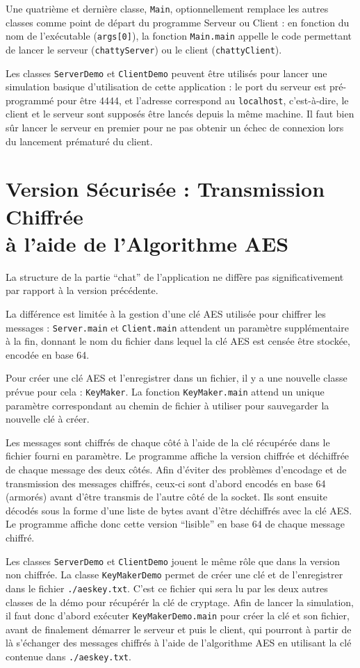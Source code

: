 \documentclass[a4paper,12pt]{article}
\newcommand{\nopagenum}{\thispagestyle{empty}}
\newcommand{\code}[1]{\texttt{#1}}
\begin{document}
    Une quatrième et dernière classe, \code{Main}, optionnellement remplace les autres classes comme point de départ du programme Serveur ou Client : en fonction du nom de l'exécutable (\code{args[0]}), la fonction \code{Main.main} appelle le code permettant de lancer le serveur (\code{chattyServer}) ou le client (\code{chattyClient}).
    
    Les classes \code{ServerDemo} et \code{ClientDemo} peuvent être utilisés pour lancer une simulation basique d'utilisation de cette application : le port du serveur est pré-programmé pour être 4444, et l'adresse correspond au \code{localhost}, c'est-à-dire, le client et le serveur sont supposés être lancés depuis la même machine. Il faut bien sûr lancer le serveur en premier pour ne pas obtenir un échec de connexion lors du lancement prématuré du client.
    
    \section{Version Sécurisée : Transmission Chiffrée \\ à l'aide de l'Algorithme AES}
    
    La structure de la partie ``chat'' de l'application ne diffère pas significativement par rapport à la version précédente.
    
    La différence est limitée à la gestion d'une clé AES utilisée pour chiffrer les messages : \code{Server.main} et \code{Client.main} attendent un paramètre supplémentaire à la fin, donnant le nom du fichier dans lequel la clé AES est censée être stockée, encodée en base 64.
    
    Pour créer une clé AES et l'enregistrer dans un fichier, il y a une nouvelle classe prévue pour cela : \code{KeyMaker}. La fonction \code{KeyMaker.main} attend un unique paramètre correspondant au chemin de fichier à utiliser pour sauvegarder la nouvelle clé à créer.
    
    Les messages sont chiffrés de chaque côté à l'aide de la clé récupérée dans le fichier fourni en paramètre. Le programme affiche la version chiffrée et déchiffrée de chaque message des deux côtés. Afin d'éviter des problèmes d'encodage et de transmission des messages chiffrés, ceux-ci sont d'abord encodés en base 64 (armorés) avant d'être transmis de l'autre côté de la socket. Ils sont ensuite décodés sous la forme d'une liste de bytes avant d'être déchiffrés avec la clé AES. Le programme affiche donc cette version ``lisible'' en base 64 de chaque message chiffré.
    
    Les classes \code{ServerDemo} et \code{ClientDemo} jouent le même rôle que dans la version non chiffrée. La classe \code{KeyMakerDemo} permet de créer une clé et de l'enregistrer dans le fichier \code{./aeskey.txt}. C'est ce fichier qui sera lu par les deux autres classes de la démo pour récupérér la clé de cryptage. Afin de lancer la simulation, il faut donc d'abord exécuter \code{KeyMakerDemo.main} pour créer la clé et son fichier, avant de finalement démarrer le serveur et puis le client, qui pourront à partir de là s'échanger des messages chiffrés à l'aide de l'algorithme AES en utilisant la clé contenue dans \code{./aeskey.txt}.
    
    \nopagenum
\end{document}
